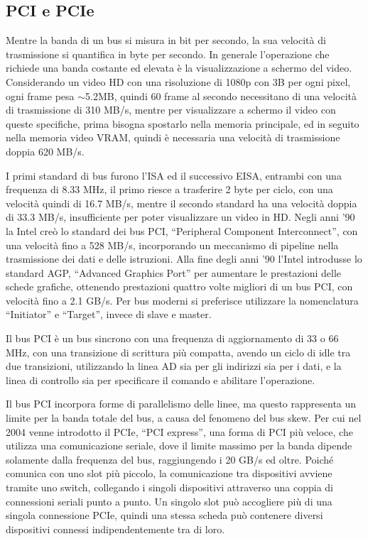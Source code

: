\documentclass{article}
\numberwithin{equation}{subsection}
\begin{document}
\subsection{PCI e PCIe}

Mentre la banda di un bus si misura in bit per secondo, la sua velocità di trasmissione si quantifica in byte per secondo. In generale l'operazione che richiede una banda costante ed 
elevata è la visualizzazione a schermo del video. Considerando un video HD con una risoluzione di 1080p con 3B per ogni pixel, ogni frame pesa $\sim$5.2MB, quindi 60 frame al secondo 
necessitano di una velocità di trasmissione di 310 MB/s, mentre per visualizzare a schermo il video con queste specifiche, prima bisogna spostarlo nella memoria principale, ed in seguito 
nella memoria video VRAM, quindi è necessaria una velocità di trasmissione doppia 620 MB/s. 

I primi standard di bus furono l'ISA ed il successivo EISA, entrambi con una frequenza di 8.33 MHz, il primo riesce a trasferire 2 byte per ciclo, con una velocità quindi di 16.7 MB/s, mentre 
il secondo standard ha una velocità doppia di 33.3 MB/s, insufficiente per poter visualizzare un video in HD. 
Negli anni '90 la Intel creò lo standard dei bus PCI, ``Peripheral Component Interconnect'', con una velocità fino a 528 MB/s, incorporando un meccanismo di pipeline nella trasmissione 
dei dati e delle istruzioni. 
Alla fine degli anni '90 l'Intel introdusse lo standard AGP, ``Advanced Graphics Port'' per aumentare le prestazioni delle schede grafiche, ottenendo prestazioni quattro volte migliori di un 
bus PCI, con velocità fino a 2.1 GB/s. 
Per bus moderni si preferisce utilizzare la nomenclatura ``Initiator'' e ``Target'', invece di slave e master. 

Il bus PCI è un bus sincrono con una frequenza di aggiornamento di 33 o 66 MHz, con una transizione di scrittura più compatta, avendo un ciclo di idle tra due transizioni, utilizzando la 
linea AD sia per gli indirizzi sia per i dati, e la linea di controllo sia per specificare il comando e abilitare l'operazione. 

Il bus PCI incorpora forme di parallelismo delle linee, ma questo rappresenta un limite per la banda totale del bus, a causa del fenomeno del bus skew. Per cui nel 2004 venne introdotto 
il PCIe, ``PCI express'', una forma di PCI più veloce, che utilizza una comunicazione seriale, dove il limite massimo per la banda dipende solamente dalla frequenza del bus, raggiungendo 
i 20 GB/s ed oltre. Poiché comunica con uno slot più piccolo, la comunicazione tra dispositivi avviene tramite uno switch, collegando i singoli dispositivi attraverso una coppia di 
connessioni seriali punto a punto. 
Un singolo slot può accogliere più di una singola connessione PCIe, quindi una stessa scheda può contenere diversi dispositivi connessi indipendentemente tra di loro. 
\end{document}
